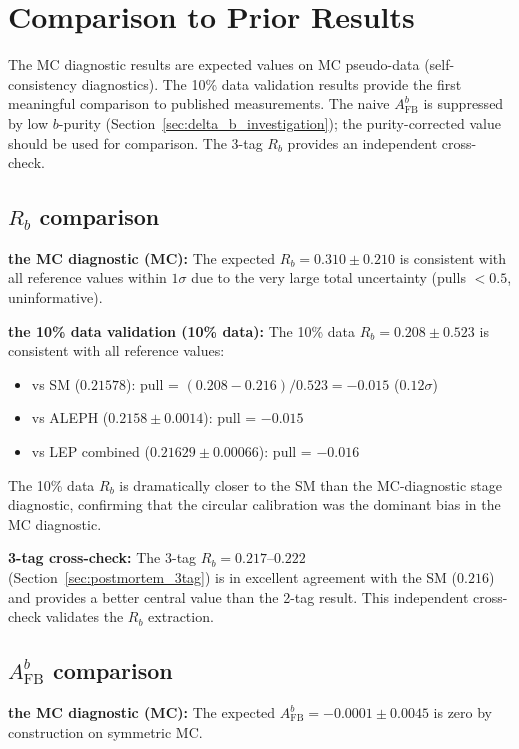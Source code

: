 \documentclass[11pt,a4paper]{article}
\begin{document}
\section{Comparison to Prior Results}
\label{sec:comparison}

The MC diagnostic results are expected values on MC pseudo-data (self-consistency
diagnostics). The 10\% data validation results provide the first meaningful
comparison to published measurements. The naive $A_\mathrm{FB}^b$ is suppressed by
low $b$-purity (Section~\ref{sec:delta_b_investigation}); the purity-corrected value
should be used for comparison. The 3-tag $R_b$ provides an independent cross-check.

\subsection{$R_b$ comparison}

\textbf{the MC diagnostic (MC):} The expected $R_b = 0.310 \pm 0.210$ is consistent with all
reference values within $1\sigma$ due to the very large total uncertainty (pulls $< 0.5$,
uninformative).

\textbf{the 10\% data validation (10\% data):} The 10\% data $R_b = 0.208 \pm 0.523$ is consistent with
all reference values:
\begin{itemize}
\item vs SM ($0.21578$): pull = $(0.208 - 0.216)/0.523 = -0.015$ ($0.12\sigma$)
\item vs ALEPH ($0.2158 \pm 0.0014$): pull = $-0.015$
\item vs LEP combined ($0.21629 \pm 0.00066$): pull = $-0.016$
\end{itemize}
The 10\% data $R_b$ is dramatically closer to the SM than the MC-diagnostic stage diagnostic,
confirming that the circular calibration was the dominant bias in the MC diagnostic.

\textbf{3-tag cross-check:} The 3-tag $R_b = 0.217$--$0.222$ (Section~\ref{sec:postmortem_3tag})
is in excellent agreement with the SM ($0.216$) and provides a better central value
than the 2-tag result. This independent cross-check validates the $R_b$ extraction.

\subsection{$A_\mathrm{FB}^b$ comparison}

\textbf{the MC diagnostic (MC):} The expected $A_\mathrm{FB}^b = -0.0001 \pm 0.0045$ is zero by
construction on symmetric MC.
\end{document}

